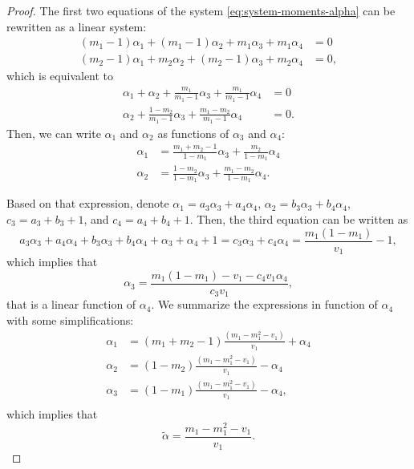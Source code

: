 \begin{proof}
  The first two equations of the system \eqref{eq:system-moments-alpha} can be
rewritten as a linear system:
\begin{align*}
  (m_1 - 1)\alpha_1 + (m_1 - 1)\alpha_2 + m_1\alpha_3 + m_1\alpha_4 &= 0 \\
  (m_2 - 1)\alpha_1 + m_2\alpha_2 + (m_2-1)\alpha_3 + m_2\alpha_4 &= 0,   
\end{align*}
which is equivalent to 
\begin{align*}
  \alpha_1 + \alpha_2 + \frac{m_1}{m_1-1}\alpha_3 + \frac{m_1}{m_1-1}\alpha_4 &= 0 \\
  \alpha_2 + \frac{1-m_2}{m_1-1}\alpha_3 + \frac{m_1-m_2}{m_1-1}\alpha_4 &= 0.
\end{align*}
Then, we can write $\alpha_1$ and $\alpha_2$ as functions of $\alpha_3$ and
$\alpha_4$:
\begin{align}
  \alpha_1 &= \frac{m_1+m_2-1}{1-m_1}\alpha_3 + \frac{m_2}{1-m_1}\alpha_4 \\
  \alpha_2 &= \frac{1-m_2}{1-m_1}\alpha_3 + \frac{m_1-m_2}{1-m_1}\alpha_4.
\end{align}

Based on that expression, denote $\alpha_1 = a_3\alpha_3 + a_4\alpha_4$, $\alpha_2
= b_3\alpha_3 + b_4\alpha_4$, $c_3 = a_3 + b_3 + 1$, and $c_4 = a_4 + b_4 + 1$. Then, the third equation can be written as 
$$
a_3\alpha_3 + a_4\alpha_4 + b_3\alpha_3 + b_4\alpha_4 + \alpha_3 + \alpha_4 + 1 = c_3\alpha_3 + c_4 \alpha_4 = \frac{m_1(1-m_1)}{v_1} - 1, 
$$
which implies that 
$$
\alpha_3 = \frac{m_1(1-m_1) - v_1 - c_4v_1\alpha_4}{c_3v_1},
$$
that is a linear function of $\alpha_4$. We summarize the expressions in function of $\alpha_4$ with some simplifications: 
\begin{align*}
  \alpha_1 &= (m_1 + m_2 - 1)\frac{(m_1 - m_1^2 - v_1)}{v_1} + \alpha_4 \\
  \alpha_2 &=  (1 - m_2)\frac{(m_1 - m_1^2 - v_1)}{v_1} - \alpha_4 \\
  \alpha_3 &= (1-m_1)\frac{(m_1 - m_1^2 - v_1)}{v_1} - \alpha_4, \\
\end{align*}
which implies that 
$$
\tilde{\alpha} = \frac{m_1 - m_1^2 - v_1}{v_1}.
$$


\end{proof}

